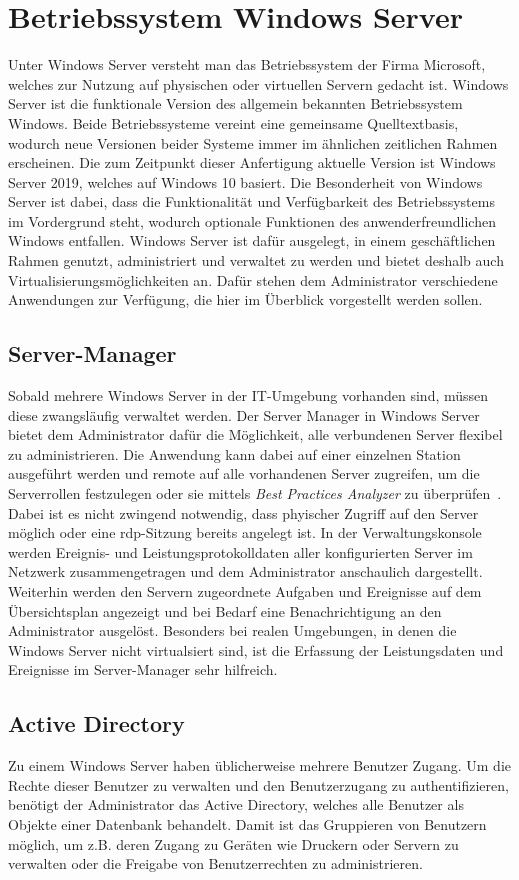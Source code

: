 \chapter{Betriebssystem Windows Server}
Unter Windows Server versteht man das Betriebssystem der Firma Microsoft, welches zur Nutzung auf physischen oder virtuellen Servern gedacht ist. Windows Server ist die funktionale Version des allgemein bekannten Betriebssystem Windows. Beide Betriebssysteme vereint eine gemeinsame Quelltextbasis, wodurch neue Versionen beider Systeme immer im ähnlichen zeitlichen Rahmen erscheinen. Die zum Zeitpunkt dieser Anfertigung aktuelle Version ist Windows Server 2019, welches auf Windows 10 basiert. Die Besonderheit von Windows Server ist dabei, dass die Funktionalität und Verfügbarkeit des Betriebssystems im Vordergrund steht, wodurch optionale Funktionen des anwenderfreundlichen Windows entfallen. Windows Server ist dafür ausgelegt, in einem geschäftlichen Rahmen genutzt, administriert und verwaltet zu werden und bietet deshalb auch Virtualisierungsmöglichkeiten an. Dafür stehen dem Administrator verschiedene Anwendungen zur Verfügung, die hier im Überblick vorgestellt werden sollen. \cite{Hagel2021}
\section{Server-Manager}\label{sec:servermanager}
Sobald mehrere Windows Server in der IT-Umgebung vorhanden sind, müssen diese zwangsläufig verwaltet werden. Der Server Manager in Windows Server bietet dem Administrator dafür die Möglichkeit, alle verbundenen Server flexibel zu administrieren. Die Anwendung kann dabei auf einer einzelnen Station ausgeführt werden und remote auf alle vorhandenen Server zugreifen, um die Serverrollen festzulegen oder sie mittels \textit{Best Practices Analyzer} zu überprüfen~\cite[S.~20 ff.]{2014}.
Dabei ist es nicht zwingend notwendig, dass phyischer Zugriff auf den Server möglich oder eine \acrlong{rdp}-Sitzung bereits angelegt ist. In der Verwaltungskonsole werden Ereignis- und Leistungsprotokolldaten aller konfigurierten Server im Netzwerk zusammengetragen und dem Administrator anschaulich dargestellt. Weiterhin werden den Servern zugeordnete Aufgaben und Ereignisse auf dem Übersichtsplan angezeigt und bei Bedarf eine Benachrichtigung an den Administrator ausgelöst. Besonders bei realen Umgebungen, in denen die Windows Server nicht virtualsiert sind, ist die Erfassung der Leistungsdaten und Ereignisse im Server-Manager sehr hilfreich. \cite{Microsoft2017}
\section{Active Directory}\label{sec:ad}
Zu einem Windows Server haben üblicherweise mehrere Benutzer Zugang. Um die Rechte dieser Benutzer zu verwalten und den Benutzerzugang zu authentifizieren, benötigt der Administrator das Active Directory, welches alle Benutzer als Objekte einer Datenbank behandelt. Damit ist das Gruppieren von Benutzern möglich, um z.B. deren Zugang zu Geräten wie Druckern oder Servern zu verwalten oder die Freigabe von Benutzerrechten zu administrieren. \cite[S.~30 ff.]{2014}
